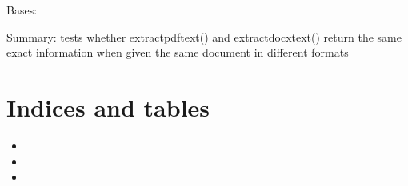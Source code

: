 \documentclass[letterpaper,10pt,english]{sphinxmanual}
\begin{document}
\begin{fulllineitems}
\label{\detokenize{unit_tests:unit_tests.test_pdfanddocxarereadthesame.TestEnsurepdfanddocxarereadthesame}}
Bases: 

\begin{fulllineitems}
\label{\detokenize{unit_tests:unit_tests.test_pdfanddocxarereadthesame.TestEnsurepdfanddocxarereadthesame.test_ensurepdfanddocarereadthesame}}
Summary: tests whether extractpdftext() and extractdocxtext() return 
the same exact information when given the same document in different formats

\end{fulllineitems}


\end{fulllineitems}



\chapter{Indices and tables}
\label{\detokenize{index:indices-and-tables}}\begin{itemize}
\item {} 

\item {} 

\item {} 

\end{itemize}
\end{document}
